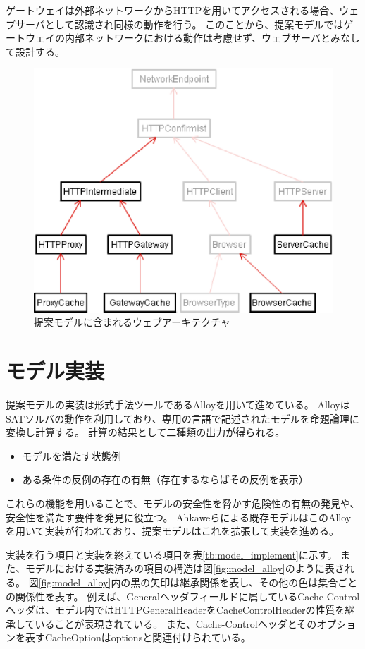 \documentclass{css}
\begin{document}
ゲートウェイは外部ネットワークからHTTPを用いてアクセスされる場合、ウェブサーバとして認識され同様の動作を行う。
このことから、提案モデルではゲートウェイの内部ネットワークにおける動作は考慮せず、ウェブサーバとみなして設計する。

\begin{figure}[htb]
\centering
\includegraphics[width=0.8\hsize]{model_archi.eps}
\caption{提案モデルに含まれるウェブアーキテクチャ}
\label{fig:model_header}
\end{figure}

\section{モデル実装}
\label{sec:implementation}
提案モデルの実装は形式手法ツールであるAlloyを用いて進めている。
\color{red}
AlloyはSATソルバの動作を利用しており、専用の言語で記述されたモデルを命題論理に変換し計算する。
計算の結果として二種類の出力が得られる。
\begin{itemize}
\item モデルを満たす状態例
\item ある条件の反例の存在の有無（存在するならばその反例を表示）
\end{itemize}
これらの機能を用いることで、モデルの安全性を脅かす危険性の有無の発見や、安全性を満たす要件を発見に役立つ。
\color{black}
Ahkaweらによる既存モデル\cite{webmodel}はこのAlloyを用いて実装が行われており、提案モデルはこれを拡張して実装を進める。

実装を行う項目と実装を終えている項目を表\ref{tb:model_implement}に示す。
また、モデルにおける実装済みの項目の構造は図\ref{fig:model_alloy}のように表される。
図\ref{fig:model_alloy}内の黒の矢印は継承関係を表し、その他の色は集合ごとの関係性を表す。
\color{red}
例えば、Generalヘッダフィールドに属しているCache-Controlヘッダは、モデル内ではHTTPGeneralHeaderをCacheControlHeaderの性質を継承していることが表現されている。
\color{black}
また、Cache-Controlヘッダとそのオプションを表すCacheOptionはoptionsと関連付けられている。
\end{document}
